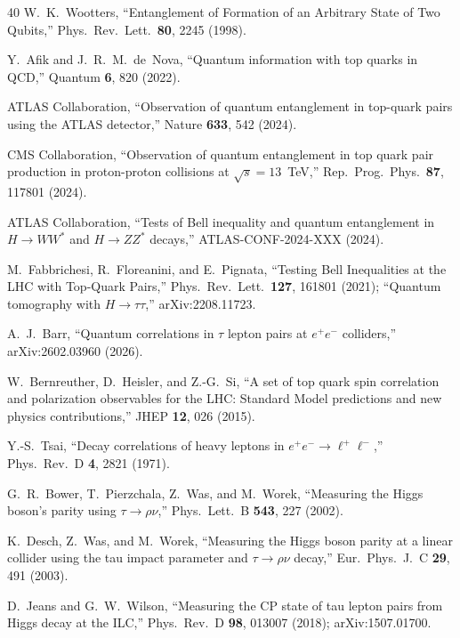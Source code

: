 \documentclass[prl,twocolumn,superscriptaddress,floatfix]{revtex4-2}
\begin{document}
\begin{thebibliography}{40}
  W.~K.~Wootters,
  ``Entanglement of Formation of an Arbitrary State of Two Qubits,''
  Phys.\ Rev.\ Lett.\ \textbf{80}, 2245 (1998).

  Y.~Afik and J.~R.~M.~de~Nova,
  ``Quantum information with top quarks in QCD,''
  Quantum \textbf{6}, 820 (2022).

  ATLAS Collaboration,
  ``Observation of quantum entanglement in top-quark pairs
  using the ATLAS detector,''
  Nature \textbf{633}, 542 (2024).

  CMS Collaboration,
  ``Observation of quantum entanglement in top quark pair production
  in proton-proton collisions at $\sqrt{s}=13$~TeV,''
  Rep.\ Prog.\ Phys.\ \textbf{87}, 117801 (2024).

  ATLAS Collaboration,
  ``Tests of Bell inequality and quantum entanglement in
  $H\to WW^*$ and $H\to ZZ^*$ decays,''
  ATLAS-CONF-2024-XXX (2024).

  M.~Fabbrichesi, R.~Floreanini, and E.~Pignata,
  ``Testing Bell Inequalities at the LHC with Top-Quark Pairs,''
  Phys.\ Rev.\ Lett.\ \textbf{127}, 161801 (2021);
  ``Quantum tomography with $H\to\tau\tau$,''
  arXiv:2208.11723.

  A.~J.~Barr,
  ``Quantum correlations in $\tau$ lepton pairs at $e^+e^-$ colliders,''
  arXiv:2602.03960 (2026).

  W.~Bernreuther, D.~Heisler, and Z.-G.~Si,
  ``A set of top quark spin correlation and polarization observables
  for the LHC: Standard Model predictions and new physics
  contributions,''
  JHEP \textbf{12}, 026 (2015).

  Y.-S.~Tsai,
  ``Decay correlations of heavy leptons in
  $e^+e^-\to\ell^+\ell^-$,''
  Phys.\ Rev.\ D \textbf{4}, 2821 (1971).

  G.~R.~Bower, T.~Pierzchala, Z.~Was, and M.~Worek,
  ``Measuring the Higgs boson's parity using $\tau\to\rho\nu$,''
  Phys.\ Lett.\ B \textbf{543}, 227 (2002).

  K.~Desch, Z.~Was, and M.~Worek,
  ``Measuring the Higgs boson parity at a linear collider
  using the tau impact parameter and $\tau\to\rho\nu$ decay,''
  Eur.\ Phys.\ J.\ C \textbf{29}, 491 (2003).

  D.~Jeans and G.~W.~Wilson,
  ``Measuring the CP state of tau lepton pairs from Higgs decay
  at the ILC,''
  Phys.\ Rev.\ D \textbf{98}, 013007 (2018);
  arXiv:1507.01700.


\end{thebibliography}
\end{document}
